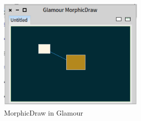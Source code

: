 \documentclass[10pt]{article}   	%
\begin{document}
\begin{figure}[htb]
\begin{center}
\includegraphics[width=200pt]{GlamourMorphicDraw.png}
\caption{MorphicDraw in Glamour}
\label{glamour}
\end{center}
\end{figure}
\end{document}
